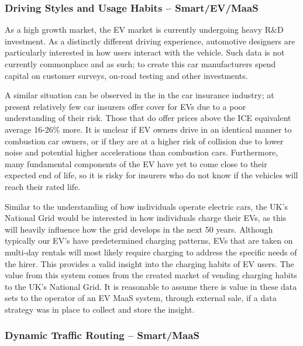 \documentclass[journal]{IEEEtran}
\begin{document}
\subsubsection{Driving Styles and Usage Habits -- Smart/EV/MaaS} 

As a high growth market, the EV market is currently undergoing heavy
R\&D investment. As a distinctly different driving experience,
automotive designers are particularly interested in how users interact
with the vehicle. Such data is not currently commonplace and as such;
to create this car manufacturers spend capital on customer surveys,
on-road testing and other investments.

A similar situation can be observed in the in the car insurance
industry; at present relatively few car insurers offer cover for EVs
due to a poor understanding of their risk. Those that do offer prices
above the ICE equivalent average 16-26\% more. It is unclear if EV
owners drive in an identical manner to combustion car owners, or if
they are at a higher risk of collision due to lower noise and
potential higher accelerations than combustion cars. Furthermore, many
fundamental components of the EV have yet to come close to their
expected end of life, so it is risky for insurers who do not know if
the vehicles will reach their rated life.

Similar to the understanding of how individuals operate electric cars,
the UK’s National Grid would be interested in how individuals charge
their EVs, as this will heavily influence how the grid develops in the
next 50 years. Although typically our EV's have predetermined charging
patterns, EVs that are taken on multi-day rentals will most likely
require charging to address the specific needs of the hirer. This
provides a valid insight into the charging habits of EV users. The
value from this system comes from the created market of vending
charging habits to the UK's National Grid. It is reasonable to assume
there is value in these data sets to the operator of an EV MaaS
system, through external sale, if a data strategy was in place to
collect and store the insight.

\subsubsection{Dynamic Traffic Routing -- Smart/MaaS} 
\end{document}
